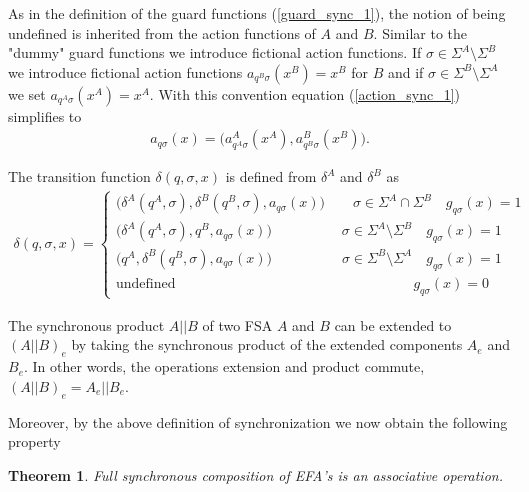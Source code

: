 \documentclass{article}
\newtheorem{theorem}{Theorem}
\begin{document}
As in the definition of the guard functions (\ref{guard_sync_1}),
the notion of being undefined is inherited from the action
functions of $A$ and $B$. Similar to the "dummy" guard functions
we introduce fictional action functions. If $\sigma\in \Sigma^A
\setminus \Sigma^B$ we introduce fictional action functions
$a_{q^B\sigma}(x^B)=x^B$ for $B$ and if
$\sigma\in\Sigma^B\setminus \Sigma^A$ we set
$a_{q^A\sigma}(x^A)=x^A$. With this convention equation
(\ref{action_sync_1}) simplifies to
\begin{eqnarray}
a_{q \sigma}(x)=
 \big(a^A_{q^A \sigma}(x^{A}), a^B_{q^B \sigma}(x^{B})\big).
\end{eqnarray}


 The transition function
$\delta(q,\sigma,x)$ is defined from $\delta^A$ and $\delta^B$ as
\begin{eqnarray}
\delta(q,\sigma,x)=\left\{
\begin{array}{ll}
\big(\delta^A(q^A,\sigma),\delta^B(q^B,\sigma),a_{q \sigma}(x)\big) \quad\quad \sigma\in \Sigma^A \cap \Sigma^B \quad g_{q \sigma}(x)=1\\
\big(\delta^A(q^A,\sigma),q^B,a_{q \sigma}(x)\big) \quad\quad\quad\quad\quad \sigma\in \Sigma^A \setminus \Sigma^B \quad g_{q \sigma}(x)=1\\
\big(q^A,\delta^B(q^B,\sigma),a_{q \sigma}(x)\big) \quad\quad\quad\quad\quad \sigma\in \Sigma^B \setminus \Sigma^A \quad g_{q \sigma}(x)=1\\
\textrm{
undefined}\quad\quad\quad\quad\quad\quad\quad\quad\quad\quad\quad\quad\quad\quad\quad\quad\quad
g_{q\sigma}(x)=0
\end{array}\right.
\end{eqnarray}

The synchronous product $A||B$ of two FSA $A$ and $B$ can be
extended to $(A||B)_e$ by taking the synchronous product of the
extended components  $A_e$ and $B_e$. In other words, the
operations extension and product commute, $(A||B)_e=A_e||B_e$.

Moreover, by the above definition of synchronization we now obtain
the following property

\begin{theorem}
   Full synchronous composition of EFA's is an associative
   operation.
\end{theorem}
\end{document}
